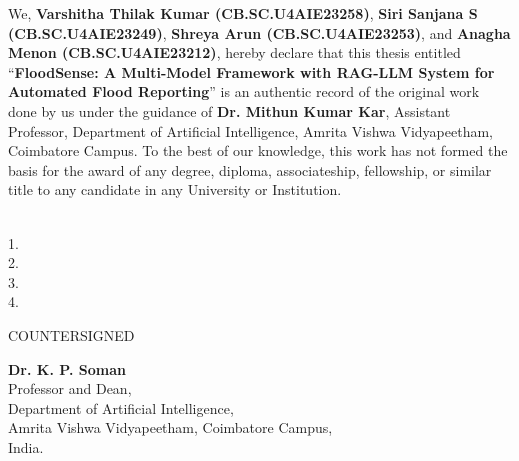 \documentclass[a4paper, 12pt]{report}
\theoremstyle{definition}
\begin{document}
	\noindent We, \textbf{Varshitha Thilak Kumar (CB.SC.U4AIE23258)}, \textbf{Siri Sanjana S (CB.SC.U4AIE23249)}, \textbf{Shreya Arun (CB.SC.U4AIE23253)}, and \textbf{Anagha Menon (CB.SC.U4AIE23212)}, hereby declare that this thesis entitled \enquote{\textbf{FloodSense: A Multi-Model Framework with RAG-LLM System for Automated Flood Reporting}} is an authentic record of the original work done by us under the guidance of \textbf{Dr. Mithun Kumar Kar}, Assistant Professor, Department of Artificial Intelligence, Amrita Vishwa Vidyapeetham, Coimbatore Campus. To the best of our knowledge, this work has not formed the basis for the award of any degree, diploma, associateship, fellowship, or similar title to any candidate in any University or Institution.\\

	\vspace*{1cm}
	 \\
	\vspace{1.2cm}
	
	\begin{flushright}
		1. \underline{\hspace{4.5cm}}\\
		2. \underline{\hspace{4.5cm}}\\
		3. \underline{\hspace{4.5cm}}\\
		4. \underline{\hspace{4.5cm}}\\
	\end{flushright}
	
	\vfill
	\begin{center}
		\large{COUNTERSIGNED}\\
	\end{center}
	\vspace{0.3in}
	
    \begin{center}
		\textbf{Dr. K. P. Soman}\\
		Professor and Dean, \\ 
		Department of Artificial Intelligence, \\
		Amrita Vishwa Vidyapeetham, Coimbatore Campus,\\
		India.
    \end{center}
	
	\clearpage
	
\end{document}
